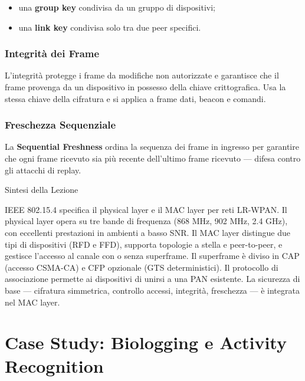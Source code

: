 \documentclass[
  italian,
  openany]{book}
\providecommand{\tightlist}{%
  \setlength{\itemsep}{0pt}\setlength{\parskip}{0pt}}
\begin{document}
\begin{itemize}
\tightlist
\item
  una \textbf{group key} condivisa da un gruppo di dispositivi;
\item
  una \textbf{link key} condivisa solo tra due peer specifici.
\end{itemize}

\subsection{Integrità dei Frame}\label{integrituxe0-dei-frame}

L'integrità protegge i frame da modifiche non autorizzate e garantisce
che il frame provenga da un dispositivo in possesso della chiave
crittografica. Usa la stessa chiave della cifratura e si applica a frame
dati, beacon e comandi.

\subsection{Freschezza Sequenziale}\label{freschezza-sequenziale}

La \textbf{Sequential Freshness} ordina la sequenza dei frame in
ingresso per garantire che ogni frame ricevuto sia più recente
dell'ultimo frame ricevuto --- difesa contro gli attacchi di replay.

\begin{calloutnote}{Sintesi della Lezione}

IEEE 802.15.4 specifica il physical layer e il MAC layer per reti
LR-WPAN. Il physical layer opera su tre bande di frequenza (868 MHz, 902
MHz, 2.4 GHz), con eccellenti prestazioni in ambienti a basso SNR. Il
MAC layer distingue due tipi di dispositivi (RFD e FFD), supporta
topologie a stella e peer-to-peer, e gestisce l'accesso al canale con o
senza superframe. Il superframe è diviso in CAP (accesso CSMA-CA) e CFP
opzionale (GTS deterministici). Il protocollo di associazione permette
ai dispositivi di unirsi a una PAN esistente. La sicurezza di base ---
cifratura simmetrica, controllo accessi, integrità, freschezza --- è
integrata nel MAC layer.

\end{calloutnote}

\newpage

\chapter{Case Study: Biologging e Activity
Recognition}\label{case-study-biologging-e-activity-recognition}
\end{document}
